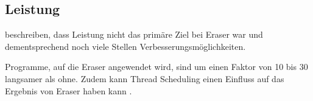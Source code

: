 \subsection*{Leistung}

\textcite[vgl.][400]{savage_eraser_nodate} beschreiben, dass Leistung nicht das primäre Ziel bei Eraser war und dementsprechend noch viele Stellen Verbesserungsmöglichkeiten. 

Programme, auf die Eraser angewendet wird, sind um einen Faktor von 10 bis 30 langsamer als ohne. Zudem kann Thread Scheduling einen Einfluss auf das Ergebnis von Eraser haben kann \cite[vgl.][400]{savage_eraser_nodate}.   


